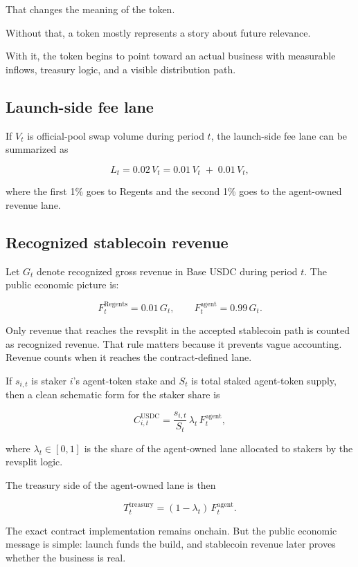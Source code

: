 \documentclass[11pt]{article}
\begin{document}
That changes the meaning of the token.

Without that, a token mostly represents a story about future relevance.

With it, the token begins to point toward an actual business with measurable inflows, treasury logic, and a visible distribution path.

\subsection{Launch-side fee lane}

If $V_t$ is official-pool swap volume during period $t$, the launch-side fee lane can be summarized as

\[
L_t = 0.02\,V_t
    = 0.01\,V_t \;+\; 0.01\,V_t,
\]

where the first 1\% goes to Regents and the second 1\% goes to the agent-owned revenue lane.

\subsection{Recognized stablecoin revenue}

Let $G_t$ denote recognized gross revenue in Base USDC during period $t$. The public economic picture is:

\[
F_t^{\mathrm{Regents}} = 0.01\,G_t,
\qquad
F_t^{\mathrm{agent}} = 0.99\,G_t.
\]

Only revenue that reaches the revsplit in the accepted stablecoin path is counted as recognized revenue. That rule matters because it prevents vague accounting. Revenue counts when it reaches the contract-defined lane.

If $s_{i,t}$ is staker $i$'s agent-token stake and $S_t$ is total staked agent-token supply, then a clean schematic form for the staker share is

\[
C_{i,t}^{\mathrm{USDC}}
=
\frac{s_{i,t}}{S_t}\,\lambda_t\,F_t^{\mathrm{agent}},
\]

where $\lambda_t \in [0,1]$ is the share of the agent-owned lane allocated to stakers by the revsplit logic.

The treasury side of the agent-owned lane is then

\[
T_t^{\mathrm{treasury}}
=
(1-\lambda_t)\,F_t^{\mathrm{agent}}.
\]

The exact contract implementation remains onchain. But the public economic message is simple: launch funds the build, and stablecoin revenue later proves whether the business is real.
\end{document}
